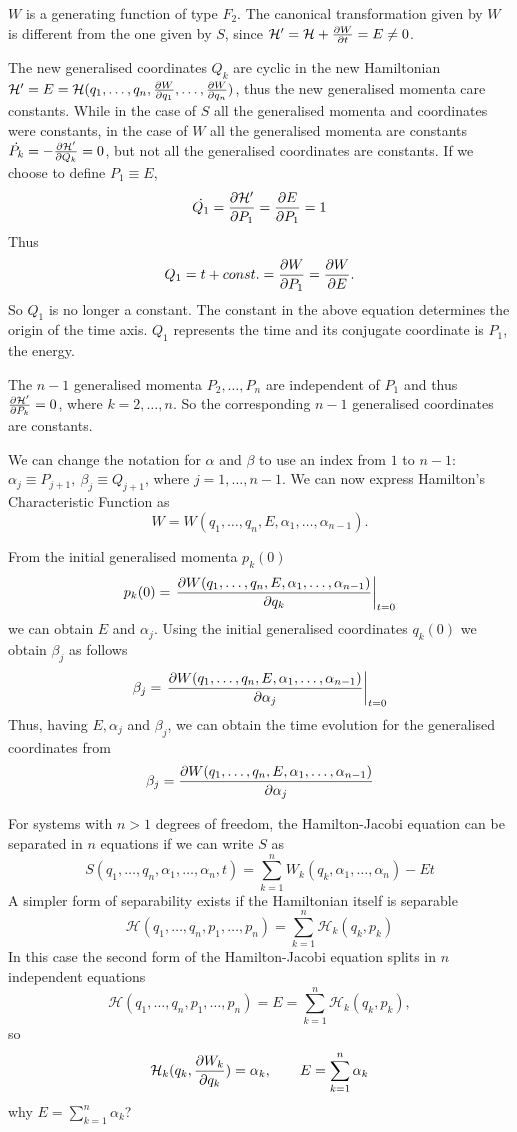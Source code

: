 \documentclass[../thesis.tex]{subfiles}
\theoremstyle{plain}
\begin{document}
\(W\) is a generating function of type \(F_2\). The canonical transformation given by \(W\)
is different from the one given by \(S\), since
\(\mathcal{H'} = \mathcal{H} + \pdv{W}{t} = E \neq 0\).

The new generalised coordinates \(Q_k\) are cyclic in the new Hamiltonian
\(\mathcal{H'} = E = \mathcal{H}(q_1,\dotsc,q_n,\pdv{W}{q_1},\dotsc,\pdv{W}{q_n})\),
thus the new generalised momenta care constants. While in the case of \(S\)
all the generalised momenta and coordinates were constants, in the case of \(W\)
all the generalised momenta are constants \(\dot{P_k}=-\pdv{\mathcal{H'}}{Q_k}=0\),
but not all the generalised coordinates are constants.
If we choose to define \(P_1 \equiv E\),
\[
  \dot{Q_1} = \pdv{\mathcal{H'}}{P_1} = \pdv{E}{P_1} = 1
\]
Thus
\[
  Q_1 = t + const. = \pdv{W}{P_1} = \pdv{W}{E}.
\]
So \(Q_1\) is no longer a constant. The constant in the above equation determines the
origin of the time axis. \(Q_1\) represents the time and its conjugate coordinate is
\(P_1\), the energy.

The \(n-1\) generalised momenta \(P_2,\dotsc,P_n\) are independent of \(P_1\)
and thus \(\pdv{\mathcal{H'}}{P_k} = 0\), where \(k=2,\dotsc,n\). So the corresponding
\(n-1\) generalised coordinates are constants.

We can change the notation for \(\alpha \) and \(\beta \) to use an index from \(1\) to \(n-1\):
\(\alpha_j \equiv P_{j+1},\ \beta_j \equiv Q_{j+1}\), where \(j=1,\dotsc,n-1\).
We can now express Hamilton's Characteristic Function as
\[
  W=W(q_1,\dotsc,q_n,E,\alpha_1,\dotsc,\alpha_{n-1}).
\]

From the initial generalised momenta \(p_k(0)\)
\[
  p_k(0) = \eval{\pdv{W(q_1,\dotsc,q_n,E,\alpha_1,\dotsc,\alpha_{n-1})}{q_k}}_{t=0}
\]
we can obtain \(E\) and \(\alpha_j\). Using the initial generalised coordinates \(q_k(0)\)
we obtain \(\beta_j\) as follows
\[
  \beta_j = \eval{\pdv{W(q_1,\dotsc,q_n,E,\alpha_1,\dotsc,\alpha_{n-1})}{\alpha_j}}_{t=0}
\]
Thus, having \(E, \alpha_j\) and \(\beta_j\), we can obtain the time evolution
for the generalised coordinates from
\[
  \beta_j = \pdv{W(q_1,\dotsc,q_n,E,\alpha_1,\dotsc,\alpha_{n-1})}{\alpha_j}
\]

For systems with \(n>1\) degrees of freedom, the Hamilton-Jacobi equation can be separated in
\(n\) equations if we can write \(S\) as
\[
  S(q_1,\dotsc,q_n,\alpha_1,\dotsc,\alpha_n,t) = \sum_{k=1}^n W_k(q_k,\alpha_1,\dotsc,\alpha_n)-Et
\]
A simpler form of separability exists if the Hamiltonian itself is separable
\[
  \mathcal{H}(q_1,\dotsc,q_n,p_1,\dotsc,p_n) = \sum_{k=1}^n \mathcal{H}_k(q_k,p_k)
\]
In this case the second form of the Hamilton-Jacobi equation splits in \(n\) independent equations
\[
  \mathcal{H}(q_1,\dotsc,q_n,p_1,\dotsc,p_n) = E = \sum_{k=1}^n \mathcal{H}_k(q_k,p_k),
\]
so
\[
  \mathcal{H}_k(q_k,\pdv{W_k}{q_k}) = \alpha_k,\qquad E = \sum_{k=1}^n \alpha_k
\]
{\color{red}why \(E = \sum_{k=1}^n \alpha_k\)?}
\end{document}
